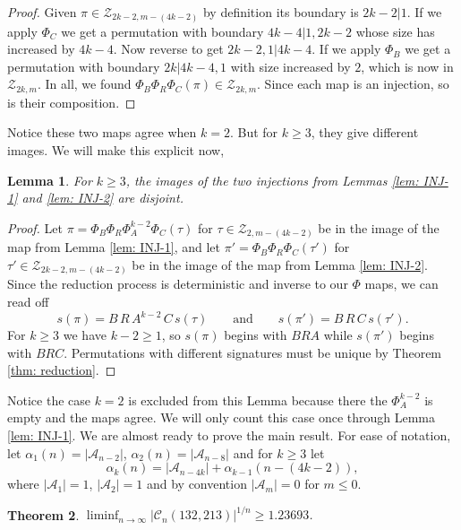 \documentclass[11pt]{article}
\newcommand\A{\mathcal A}
\newcommand\cZ{\mathcal Z}
\newcommand\C{\mathcal C}
\newtheorem{theorem}{Theorem}[section]
\newtheorem{lemma}[theorem]{Lemma}
\theoremstyle{definition}
\begin{document}
\begin{proof}
    Given $\pi \in \cZ_{2k-2,m-(4k-2)}$ by definition its boundary is $2k-2|1$. If we apply $\Phi_C$ we get a permutation with boundary $4k-4|1,2k-2$ whose size has increased by $4k-4$. Now reverse to get $2k-2,1|4k-4$. If we apply $\Phi_B$ we get a permutation with boundary $2k|4k-4,1$ with size increased by $2$, which is now in $\cZ_{2k,m}$. In all, we found $\Phi_B\Phi_R\Phi_C(\pi) \in \cZ_{2k,m}$. Since each map is an injection, so is their composition.
\end{proof}

Notice these two maps agree when $k = 2$. But for $k \ge 3$, they give different images. We will make this explicit now,

\begin{lemma} \label{lem: disjoint-injs}
    For $k \ge 3$, the images of the two injections from Lemmas \ref{lem: INJ-1} and \ref{lem: INJ-2} are disjoint.
\end{lemma}

\begin{proof}
    Let $\pi = \Phi_B\Phi_R\Phi_A^{k-2}\Phi_C(\tau)$ for $\tau \in \cZ_{2,m-(4k-2)}$ be in the image of the map from Lemma \ref{lem: INJ-1}, and let $\pi' = \Phi_B\Phi_R\Phi_C(\tau')$ for $\tau' \in \cZ_{2k-2,m-(4k-2)}$ be in the image of the map from Lemma \ref{lem: INJ-2}. Since the reduction process is deterministic and inverse to our $\Phi$ maps, we can read off
    \[
    s(\pi) = B\,R\,A^{k-2}\,C\,s(\tau) \qquad \text{and} \qquad s(\pi') = B\,R\,C\,s(\tau').
    \]
    For $k \ge 3$ we have $k-2 \ge 1$, so $s(\pi)$ begins with $BRA$ while $s(\pi')$ begins with $BRC$. Permutations with different signatures must be unique by Theorem \ref{thm: reduction}.
\end{proof}

Notice the case $k = 2$ is excluded from this Lemma because there the $\Phi_A^{k-2}$ is empty and the maps agree. We will only count this case once through Lemma \ref{lem: INJ-1}. We are almost ready to prove the main result. For ease of notation, let $\alpha_1(n) = |\A_{n-2}|$, $\alpha_2(n) = |\A_{n-8}|$ and for $k \ge 3$ let
    \[
    \alpha_k(n) = |\A_{n-4k}| + \alpha_{k-1}(n-(4k-2)),
    \]
where $|\A_1| = 1$, $|\A_2| = 1$ and by convention $|\A_m| = 0$ for $m \le 0$.

\begin{theorem} \label{thm: lowerBound}
    $\liminf_{n \to \infty} |\C_n(132,213)|^{1/n} \ge 1.23693$.
\end{theorem}
\end{document}
